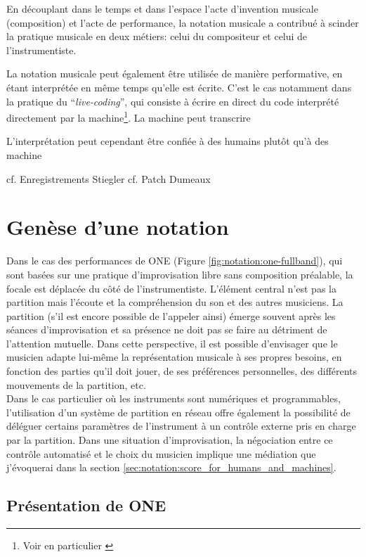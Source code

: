 En découplant dans le temps et dans l'espace l'acte d'invention musicale (composition) et l'acte de performance, la notation musicale a contribué à scinder la pratique musicale en deux métiers: celui du compositeur et celui de l'instrumentiste.

La notation musicale peut également être utilisée de manière performative, en étant interprétée en même temps qu'elle est écrite. C'est le cas notamment dans la pratique du ``\textit{live-coding}'', qui consiste à écrire en direct du code interprété directement par la machine\footnote{Voir en particulier \cite{magnusson_algorithms_2011}}. La machine peut transcrire 

L'interprétation peut cependant être confiée à des humains plutôt qu'à des machine


cf. Enregistrements Stiegler
cf. Patch Dumeaux

\section{Genèse d'une notation}

\noindent Dans le cas des performances de ONE (Figure \ref{fig:notation:one-fullband}), qui sont basées sur une pratique d'improvisation libre sans composition préalable, la focale est déplacée du côté de l'instrumentiste. L'élément central n'est pas la partition mais l'écoute et la compréhension du son et des autres musiciens. La partition (s'il est encore possible de l'appeler ainsi) émerge souvent après les séances d'improvisation et sa présence ne doit pas se faire au détriment de l'attention mutuelle. Dans cette perspective, il est possible d'envisager que le musicien adapte lui-même la représentation musicale à ses propres besoins, en fonction des parties qu'il doit jouer, de ses préférences personnelles, des différents mouvements de la partition, etc.\\
\indent Dans le cas particulier où les instruments sont numériques et programmables, l'utilisation d'un système de partition en réseau offre également la possibilité de déléguer certains paramètres de l'instrument à un contrôle externe pris en charge par la partition. Dans une situation d'improvisation, la négociation entre ce contrôle automatisé et le choix du musicien implique une médiation que j'évoquerai dans la section \ref{sec:notation:score_for_humans_and_machines}.

\subsection{Présentation de ONE}


